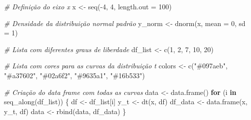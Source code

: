 \documentclass[
]{book}
\newenvironment{Shaded}{\begin{snugshade}}{\end{snugshade}}
\newcommand{\AttributeTok}[1]{\textcolor[rgb]{0.77,0.63,0.00}{#1}}
\newcommand{\CommentTok}[1]{\textcolor[rgb]{0.56,0.35,0.01}{\textit{#1}}}
\newcommand{\ControlFlowTok}[1]{\textcolor[rgb]{0.13,0.29,0.53}{\textbf{#1}}}
\newcommand{\DecValTok}[1]{\textcolor[rgb]{0.00,0.00,0.81}{#1}}
\newcommand{\FunctionTok}[1]{\textcolor[rgb]{0.00,0.00,0.00}{#1}}
\newcommand{\NormalTok}[1]{#1}
\newcommand{\OtherTok}[1]{\textcolor[rgb]{0.56,0.35,0.01}{#1}}
\newcommand{\SpecialCharTok}[1]{\textcolor[rgb]{0.00,0.00,0.00}{#1}}
\newcommand{\StringTok}[1]{\textcolor[rgb]{0.31,0.60,0.02}{#1}}
\begin{document}
\hfill\break

\begin{Shaded}
\begin{Highlighting}[]
\CommentTok{\# Definição do eixo x}
\NormalTok{x }\OtherTok{\textless{}{-}} \FunctionTok{seq}\NormalTok{(}\SpecialCharTok{{-}}\DecValTok{4}\NormalTok{, }\DecValTok{4}\NormalTok{, }\AttributeTok{length.out =} \DecValTok{100}\NormalTok{)}

\CommentTok{\# Densidade da distribuição normal padrão}
\NormalTok{y\_norm }\OtherTok{\textless{}{-}} \FunctionTok{dnorm}\NormalTok{(x, }\AttributeTok{mean =} \DecValTok{0}\NormalTok{, }\AttributeTok{sd =} \DecValTok{1}\NormalTok{)}

\CommentTok{\# Lista com diferentes graus de liberdade}
\NormalTok{df\_list }\OtherTok{\textless{}{-}} \FunctionTok{c}\NormalTok{(}\DecValTok{1}\NormalTok{, }\DecValTok{2}\NormalTok{, }\DecValTok{7}\NormalTok{, }\DecValTok{10}\NormalTok{, }\DecValTok{20}\NormalTok{)}

\CommentTok{\# Lista com cores para as curvas da distribuição t}
\NormalTok{colors }\OtherTok{\textless{}{-}} \FunctionTok{c}\NormalTok{(}\StringTok{"\#097aeb"}\NormalTok{, }\StringTok{"\#a37602"}\NormalTok{, }\StringTok{"\#02a6f2"}\NormalTok{, }\StringTok{"\#9635a1"}\NormalTok{, }\StringTok{"\#16b533"}\NormalTok{)}

\CommentTok{\# Criação do data frame com todas as curvas}
\NormalTok{data }\OtherTok{\textless{}{-}} \FunctionTok{data.frame}\NormalTok{()}
\ControlFlowTok{for}\NormalTok{ (i }\ControlFlowTok{in} \FunctionTok{seq\_along}\NormalTok{(df\_list)) \{}
\NormalTok{  df }\OtherTok{\textless{}{-}}\NormalTok{ df\_list[i]}
\NormalTok{  y\_t }\OtherTok{\textless{}{-}} \FunctionTok{dt}\NormalTok{(x, df)}
\NormalTok{  df\_data }\OtherTok{\textless{}{-}} \FunctionTok{data.frame}\NormalTok{(x, y\_t, df)}
\NormalTok{  data }\OtherTok{\textless{}{-}} \FunctionTok{rbind}\NormalTok{(data, df\_data)}
\NormalTok{\}}


\end{Highlighting}
\end{Shaded}
\end{document}
